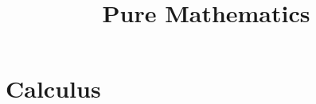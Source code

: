 \documentclass[MathsNotesBase.tex]{subfiles}
\title{Pure Mathematics}
\date{\vspace{-6ex}}
\begin{document}
	\sloppy
	\maketitle
	
	
	\newpage
	
	
	\newpage
	
	
	\pagebreak
	
	\newpage
	
	
	\newpage
	
	
	
	
	
	\newpage
	\chapter{Calculus}
	
	\newpage
	
	\newpage
	
\end{document}

